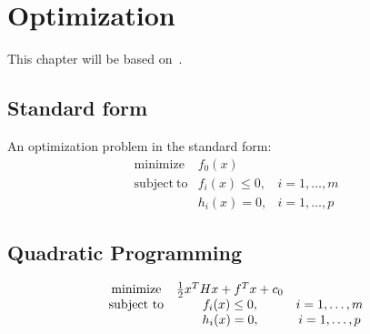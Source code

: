 \documentclass[../../mathematics_cheat_sheet.tex]{subfiles}
\begin{document}
\chapter{Optimization}
This chapter will be based on~\citet{BoydVandenberghe2004}\cite{BoydVandenberghe2004}.

\section{Standard form}
An optimization problem in the standard form:
\begin{equation}
\begin{matrix}
\mathrm{minimize} &f_{0}(x)&\\
\mathrm{subject~ to} &f_{i}(x)\leq0, &i=1,\dots,m\\
&h_{i}(x)=0, &i=1,\dots,p
\end{matrix}
\end{equation}


\section{Quadratic Programming}
\begin{equation}
\begin{matrix}
\mathrm{minimize} &{1\over2}x^{T}Hx+f^{T}x+c_{0}&\\
\mathrm{subject~ to} &f_{i}(x)\leq0, &i=1,\dots,m\\
&h_{i}(x)=0, &i=1,\dots,p
\end{matrix}
\end{equation}
\end{document}
